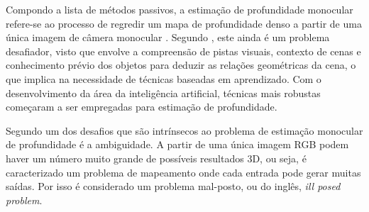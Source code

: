 Compondo a lista de métodos passivos, a estimação de profundidade monocular refere-se ao processo de regredir um mapa de profundidade denso a partir de uma única imagem de câmera monocular \cite{birkl2023midas}. Segundo , este ainda é um problema desafiador, visto que envolve a compreensão de pistas visuais, contexto de cenas e conhecimento prévio dos objetos para deduzir as relações geométricas da cena, o que implica na necessidade de técnicas baseadas em aprendizado. Com o desenvolvimento da área da inteligência artificial, técnicas mais robustas começaram a ser empregadas para estimação de profundidade. 


Segundo  um dos desafios que são intrínsecos ao problema de estimação monocular de profundidade é a ambiguidade. A partir de uma única imagem RGB podem haver um número muito grande de possíveis resultados 3D, ou seja, é caracterizado um problema de mapeamento onde cada entrada pode gerar muitas saídas. Por isso é considerado um problema mal-posto, ou do inglês, \textit{ill posed problem}.

